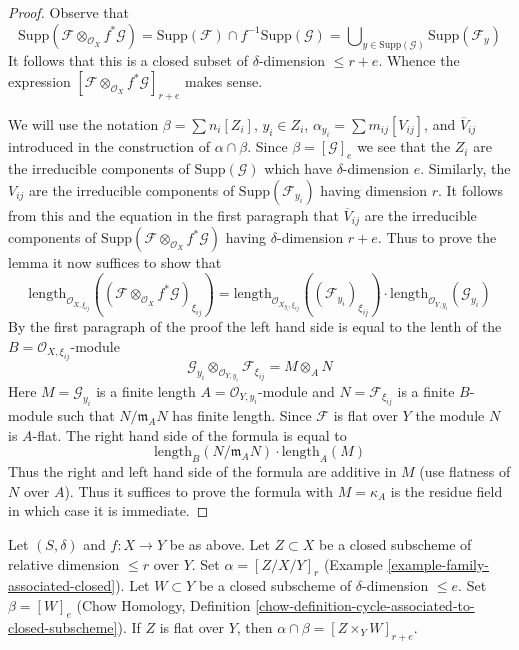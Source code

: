 \begin{proof}
Observe that
$$
\text{Supp}(\mathcal{F} \otimes_{\mathcal{O}_X} f^*\mathcal{G}) =
\text{Supp}(\mathcal{F}) \cap f^{-1}\text{Supp}(\mathcal{G}) =
\bigcup\nolimits_{y \in \text{Supp}(\mathcal{G})} \text{Supp}(\mathcal{F}_y)
$$
It follows that this is a closed subset of $\delta$-dimension $\leq r + e$.
Whence the expression
$[\mathcal{F} \otimes_{\mathcal{O}_X} f^*\mathcal{G}]_{r + e}$
makes sense.

\medskip\noindent
We will use the notation
$\beta = \sum n_i[Z_i]$, $y_i \in Z_i$,
$\alpha_{y_i} = \sum m_{ij} [V_{ij}]$, and
$\overline{V}_{ij}$ introduced in the construction
of $\alpha \cap \beta$. Since $\beta = [\mathcal{G}]_e$
we see that the $Z_i$ are the irreducible components of
$\text{Supp}(\mathcal{G})$ which have $\delta$-dimension $e$.
Similarly, the $V_{ij}$ are the irreducible components
of $\text{Supp}(\mathcal{F}_{y_i})$ having dimension $r$.
It follows from this and the equation in the first
paragraph that $\overline{V}_{ij}$ are the irreducible
components of
$\text{Supp}(\mathcal{F} \otimes_{\mathcal{O}_X} f^*\mathcal{G})$
having $\delta$-dimension $r + e$.
Thus to prove the lemma it now suffices to show that
$$
\text{length}_{\mathcal{O}_{X, \xi_{ij}}}(
(\mathcal{F} \otimes_{\mathcal{O}_X} f^*\mathcal{G})_{\xi_{ij}})
=
\text{length}_{\mathcal{O}_{X_{y_i}, \xi_{ij}}}((\mathcal{F}_{y_i})_{\xi_{ij}})
\cdot
\text{length}_{\mathcal{O}_{Y, y_i}}(\mathcal{G}_{y_i})
$$
By the first paragraph of the proof the left hand side is equal to
the lenth of the $B = \mathcal{O}_{X, \xi_{ij}}$-module
$$
\mathcal{G}_{y_i}
\otimes_{\mathcal{O}_{Y, y_i}}
\mathcal{F}_{\xi_{ij}} =
M \otimes_A N
$$
Here $M = \mathcal{G}_{y_i}$ is a finite length
$A = \mathcal{O}_{Y, y_i}$-module and $N = \mathcal{F}_{\xi_{ij}}$
is a finite $B$-module such that $N/\mathfrak m_AN$ has finite length.
Since $\mathcal{F}$ is flat over $Y$ the module $N$ is $A$-flat.
The right hand side of the formula is equal to
$$
\text{length}_B(N/\mathfrak m_A N) \cdot \text{length}_A(M)
$$
Thus the right and left hand side of the formula are additive in $M$
(use flatness of $N$ over $A$). Thus it suffices to prove the
formula with $M = \kappa_A$ is the residue field in which
case it is immediate.
\end{proof}

\begin{lemma}
\label{lemma-action-closed}
Let $(S, \delta)$ and $f : X \to Y$ be as above. Let $Z \subset X$
be a closed subscheme of relative dimension $\leq r$ over $Y$.
Set $\alpha = [Z/X/Y]_r$ (Example \ref{example-family-associated-closed}).
Let $W \subset Y$ be a closed subscheme of $\delta$-dimension $\leq e$.
Set $\beta = [W]_e$ (Chow Homology, Definition
\ref{chow-definition-cycle-associated-to-closed-subscheme}).
If $Z$ is flat over $Y$, then $\alpha \cap \beta = [Z \times_Y W]_{r + e}$.
\end{lemma}

